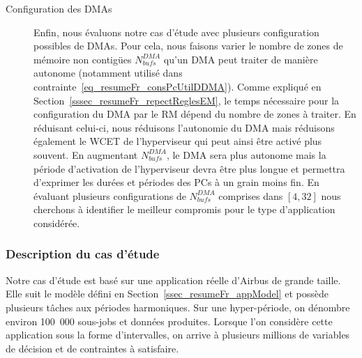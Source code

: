 \documentclass[main.tex]{subfiles}
\begin{document}
\begin{description}
    \item[Configuration des DMAs]
        Enfin, nous évaluons notre cas d'étude avec plusieurs configuration possibles de DMAs. Pour cela, nous faisons varier le nombre de zones de mémoire non contigües $N_{bufs}^{DMA}$ qu'un DMA peut traiter de manière autonome (notamment utilisé dans contrainte~\ref{eq_resumeFr_consPcUtilDDMA}). Comme expliqué en Section~\ref{sssec_resumeFr_repectReglesEM}, le temps nécessaire pour la configuration du DMA par le RM dépend du nombre de zones à traiter. En réduisant celui-ci, nous réduisons l'autonomie du DMA mais réduisons également le WCET de l'hyperviseur qui peut ainsi être activé plus souvent. En augmentant $N_{bufs}^{DMA}$, le DMA sera plus autonome mais la période d'activation de l'hyperviseur devra être plus longue et permettra d'exprimer les durées et périodes des PCs à un grain moins fin. En évaluant plusieurs configurations de $N_{bufs}^{DMA}$ comprises dans $[4,32]$ nous cherchons à identifier le meilleur compromis pour le type d'application considérée.
\end{description}

\subsubsection{Description du cas d'étude}
Notre cas d'étude est basé sur une application réelle d'Airbus de grande taille. Elle suit le modèle défini en Section~\ref{ssec_resumeFr_appModel} et possède plusieurs tâches aux périodes harmoniques. Sur une hyper-période, on dénombre environ 100~000 sous-jobs et données produites. Lorsque l'on considère cette application sous la forme d'intervalles, on arrive à plusieurs millions de variables de décision et de contraintes à satisfaire.
\end{document}
